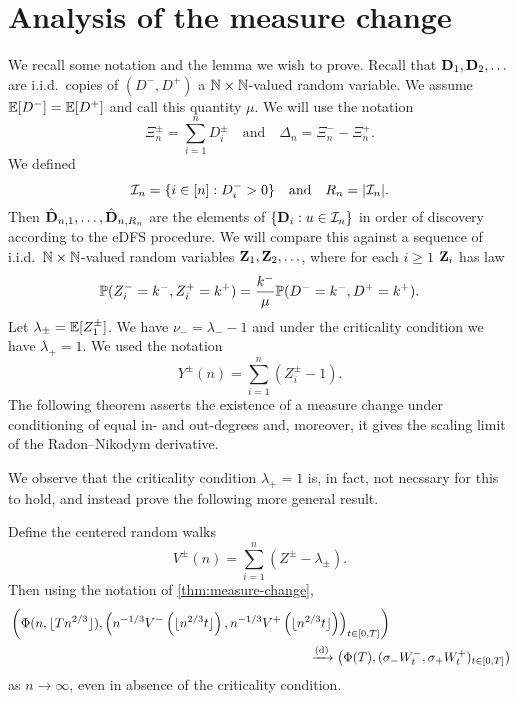 \section{Analysis of the measure change}
\label{sec:measure-change}

We recall some notation and the lemma we wish to prove. Recall that $\vD_1, \vD_2, \ldots$ are i.i.d.\ copies of $(D^-, D^+)$ a $\N \times \N$-valued random variable. We assume $\E[D^-] = \E[D^+]$ and call this quantity $\mu$. We will use the notation
\begin{equation*}
    \Xi^{\pm}_n = \textstyle \sum_{i=1}^n D^{\pm}_i
    \quad \text{and} \quad
    \Delta_n = \Xi^-_n - \Xi^+_n.
\end{equation*}
We defined
\begin{equation*}
    \cI_n = \{ i \in [n] : D_i^- > 0 \} \quad \text{and} \quad R_n = \abs{\cI_n}.
\end{equation*}
Then $\hat{\vD}_{n, 1}, \ldots, \hat{\vD}_{n, R_n}$ are the elements of $\{\vD_i : u \in \cI_n\}$ in order of discovery according to the eDFS procedure. We will compare this against a sequence of i.i.d.\ $\N \times \N$-valued random variables $\vZ_1, \vZ_2, \ldots$, where for each $i \geq 1$ $\vZ_i$ has law
\begin{equation*}
    \P(Z_i^- = k^-, Z_i^+ = k^+) = \frac{k^-}{\mu} \P(D^- = k^-, D^+ = k^+).
\end{equation*}
Let $\lambda_{\pm} = \E[Z^{\pm}_1]$. We have $\nu_- = \lambda_- - 1$ and under the criticality condition we have $\lambda_+ = 1$. We used the notation
\begin{equation*}
    Y^{\pm}(n) = \sum_{i=1}^n (Z^{\pm}_i - 1).
\end{equation*}
The following theorem asserts the existence of a measure change under conditioning of equal in- and out-degrees and, moreover, it gives the scaling limit of the Radon--Nikodym derivative.

\measurechange*

We observe that the criticality condition $\lambda_+ = 1$ is, in fact, not necssary for this to hold, and instead prove the following more general result.

\begin{lemma}
    \label{lem:measure-change-no-crit}
    Define the centered random walks
    \begin{equation*}
        V^{\pm}(n) = \sum_{i=1}^n (Z^{\pm} - \lambda_{\pm}).
    \end{equation*}
    Then using the notation of \cref{thm:measure-change},
    \begin{align*}
        &\left( 
            \Phi(n, \floor{T n^{2/3}}),
            \left(
                n^{-1/3} V^-\left( \floor{n^{2/3} t} \right),
                n^{-1/3} V^+\left( \floor{n^{2/3} t} \right)
            \right)_{t \in [0, T]}
        \right) \\
        & \hspace{23em} \todist \left( 
            \Phi(T),
            (\sigma_- W^-_t, \sigma_+ W^+_t)_{t \in [0, T]}
        \right)
    \end{align*}
    as $n \to \infty$, even in absence of the criticality condition.
\end{lemma}

